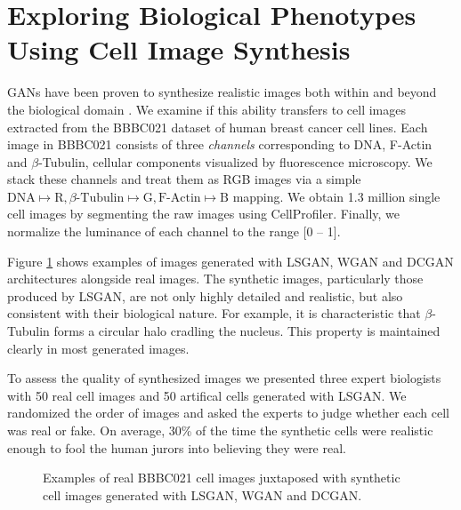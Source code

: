 \documentclass{article}
\begin{document}
\section{Exploring Biological Phenotypes Using Cell Image Synthesis}\label{synthesis}
GANs have been proven to synthesize realistic images both within and beyond the biological domain \cite{goodfellow2014generative,radford2015unsupervised,osokin2017gans}. We examine if this ability transfers to cell images extracted from the BBBC021 dataset of human breast cancer cell lines. Each image in BBBC021 consists of three \emph{channels} corresponding to DNA, F-Actin and $\beta$-Tubulin, cellular components visualized by fluorescence microscopy. We stack these channels and treat them as RGB images via a simple $\text{DNA} \mapsto \text{R}, \text{$\beta$-Tubulin} \mapsto \text{G}, \text{F-Actin} \mapsto \text{B}$ mapping. We obtain 1.3 million single cell images by segmenting the raw images using CellProfiler. Finally, we normalize the luminance of each channel to the range [0 -- 1].


Figure \ref{fig:generated} shows examples of images generated with LSGAN, WGAN
and DCGAN architectures alongside real images. The synthetic images,
particularly those produced by LSGAN, are not only highly detailed and
realistic, but also consistent with their biological nature. For example, it is
characteristic that $\beta$-Tubulin forms a circular halo cradling the nucleus.
This property is maintained clearly in most generated images.

To assess the quality of synthesized images we presented three expert biologists
with 50 real cell images and 50 artifical cells generated with LSGAN. We
randomized the order of images and asked the experts to judge whether each cell
was real or fake. On average, 30\% of the time the synthetic cells were
realistic enough to fool the human jurors into believing they were real.

\begin{figure}[b]
  \centering
  \caption{Examples of real BBBC021 cell images juxtaposed with synthetic cell images generated with LSGAN, WGAN and DCGAN.}
  \label{fig:generated}
\end{figure}
\end{document}
